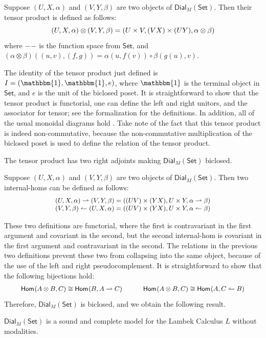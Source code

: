 \documentclass{llncs}
\let\to\relax                   %
\newcommand{\to}{\rightarrow}
\newcommand{\rto}{\leftharpoonup}
\newcommand{\lto}{\rightharpoonup}
\newcommand{\Set}{\mathsf{Set}}
\newcommand{\Dial}[2]{\mathsf{Dial}_{#1}(#2)}
\newcommand{\Hom}[3]{\mathsf{Hom}_{#1}(#2,#3)}
\begin{document}
\begin{definition}
  \label{def:dial-monoidal-structure}
  Suppose $(U, X, \alpha)$ and $(V, Y, \beta)$ are two objects of
  $\Dial{M}{\Set}$. Then their tensor product is defined as follows:
  \[ \small
  (U, X, \alpha) \otimes (V, Y, \beta) = (U \times V, (V \to X) \times (U \to Y), \alpha \otimes \beta)
  \]
  where $- \to -$ is the function space from $\Set$, and $(\alpha
  \otimes \beta)((u, v), (f, g)) = \alpha(u, f(v)) \circ \beta(g(u), v)$.
\end{definition}

\noindent
The identity of the tensor product just defined is $I = (\mathbbm{1},
\mathbbm{1}, e)$, where $\mathbbm{1}$ is the terminal object in
$\Set$, and $e$ is the unit of the biclosed poset.  It is
straightforward to show that the tensor product is functorial, one can
define the left and right unitors, and the associator for tensor; see
the formalization for the definitions.  In addition, all of the usual
monoidal diagrams hold \cite{depaiva1990}.  Take note of the fact that
this tensor product is indeed non-commutative, because the
non-commutative multiplication of the biclosed poset is used to define
the relation of the tensor product.

The tensor product has two right adjoints making $\Dial{M}{\Set}$
biclosed.
\begin{definition}
  \label{def:dial-is-biclosed}
  Suppose $(U, X, \alpha)$ and $(V, Y, \beta)$ are two objects of
  $\Dial{M}{\Set}$. Then two internal-homs can be defined as follows:
  \[ \small
  \begin{array}{lll}
    (U, X, \alpha) \lto (V, Y, \beta) = ((U \to V) \times (Y \to X), U \times Y, \alpha \lto \beta)\\
    (V, Y, \beta) \rto (U, X, \alpha) = ((U \to V) \times (Y \to X), U \times Y, \alpha \rto \beta)\\
  \end{array}
  \]
\end{definition}
These two definitions are functorial, where the first is contravariant
in the first argument and covariant in the second, but the second
internal-hom is covariant in the first argument and contravariant in
the second.  The relations in the previous two definitions prevent
these two from collapsing into the same object, because of the use of
the left and right pseudocomplement. It is straightforward to show
that the following bijections hold:
\[ \small
\begin{array}{lll}
  \Hom{}{A \otimes B}{C} \cong \Hom{}{B}{A \lto C} & \quad &  \Hom{}{A \otimes B}{C} \cong \Hom{}{A}{C \rto B}
\end{array}
\]
Therefore, $\Dial{M}{\Set}$ is biclosed, and we obtain the following
result.
\begin{theorem}
  \label{theorem:sound-lambek}
  $\Dial{M}{\Set}$ is a sound and complete model for the Lambek
  Calculus $L$ without modalities.
\end{theorem}
\end{document}
